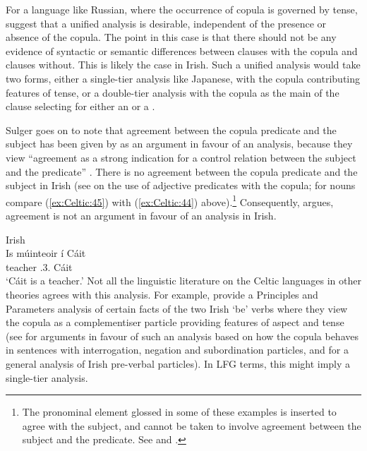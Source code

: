 \documentclass[output=paper,colorlinks,citecolor=brown]{langscibook}
\begin{document}
For a language like Russian, where the occurrence of copula is governed by tense, \citet[191--193]{dalrympleetal04copular} suggest that a unified analysis is desirable, independent of the presence or absence of the copula. The point in this case is that there should not be any evidence of syntactic or semantic differences between clauses with the copula and clauses without. This is likely the case in Irish. Such a unified analysis would take two forms, either a single-tier analysis like Japanese, with the copula contributing features of tense, or a double-tier analysis with the copula as the main \PRED of the clause selecting for either an \XCOMP or a \PREDLINK.

Sulger goes on to note that agreement between the copula predicate and the subject has been given by \citet{dalrympleetal04copular} as an argument in favour of an \XCOMP analysis, because they view ``agreement as a strong indication for a control relation between the subject and the predicate'' \citep[566]{Sulger09}. There is no agreement between the copula predicate and the subject in Irish (see \citealt[115]{MacEoin2002} on the use of adjective predicates with the copula; for nouns compare (\ref{ex:Celtic:45}) with (\ref{ex:Celtic:44}) above).\footnote{The pronominal element glossed {\AGR} in some of these examples is inserted to agree with the subject, and cannot be taken to involve agreement between the subject and the predicate. See \citet[61]{Carnie1997} and \citet[224]{OSiadhail1989}.} Consequently, \citet[567]{Sulger09} argues, agreement is not an argument in favour of an \XCOMP analysis in Irish.

\newpage
\ea\label{ex:Celtic:45} Irish \citep[224]{OSiadhail1989}\\
\gll Is  múinteoir í  Cáit\\
{\COP} teacher \AGR.{3\SG.\F} Cáit\\
\glt`Cáit is a teacher.'
\z
Not all the linguistic literature on the Celtic languages in other theories agrees with this analysis. For example,  \citet{CarnieHarley1994} provide a Principles and Parameters analysis of certain facts of the two Irish `be' verbs where they view the copula as a complementiser particle providing features of aspect and tense (see \citealt[9--10]{Doherty1996} for arguments in favour of such an analysis based on how the copula behaves in sentences with interrogation, negation and subordination particles, and \citet{Asudeh2002} for a general analysis of Irish pre-verbal particles). In LFG terms, this might imply a single-tier analysis.
\end{document}
